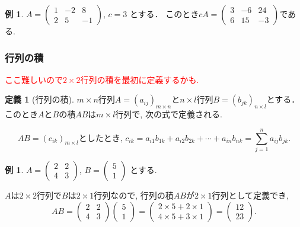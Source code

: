 \documentclass[dvipdfmx,a4paper,11pt]{article} %
\newcommand{\xr}[1]{\textcolor{red}{#1}}
\theoremstyle{definition}
\newtheorem{dfn}[thm]{定義}
\newtheorem{exa}[thm]{例}
\begin{document}
\begin{exa}
 $A = 
 \begin{pmatrix}
 1 &-2&8 \\
 2&5&-1
 \end{pmatrix}
 $,
 $
 c =3
 $
 とする．
 このとき$
 cA =
 \begin{pmatrix}
 3 &-6&24 \\
 6&15&-3
 \end{pmatrix}
 $である.
 \end{exa}
 
  \subsubsection{行列の積}
 
\xr{ここ難しいので$2 \times 2$行列の積を最初に定義するかも.}
    \begin{dfn}[行列の積]
    
 $m \times n$行列$A =(a_{ij})_{m \times n}$と$n \times l$行列$B= (b_{jk})_{n \times l}$とする．
このとき$A$と$B$の積$AB$は$m \times l$行列で, 次の式で定義される.

$$
AB = (c_{ik})_{m \times l}\text{としたとき, }
c_{ik} = a_{i1}b_{1k} + a_{i2}b_{2k} + \cdots + a_{in}b_{nk} = \sum_{j=1}^{n} a_{ij}b_{jk}.
$$
  \end{dfn}

 
  \begin{exa}
 $ A= 
 \begin{pmatrix}
2 & 2\\
4 & 3
 \end{pmatrix}
 $, $
 B = 
 \begin{pmatrix}
5 \\1
 \end{pmatrix}
 $
 とする. 
 
 $A$は$2\times 2$行列で$B$は$2 \times 1$行列なので, 行列の積$AB$が$2 \times 1$行列として定義でき, 
 $$
 AB = 
 \begin{pmatrix}
2 & 2\\
4 & 3
 \end{pmatrix}
  \begin{pmatrix}
5 \\1
 \end{pmatrix}
 =  
 \begin{pmatrix}
2\times 5 + 2\times 1 \\
4 \times 5 + 3 \times 1
 \end{pmatrix}
 = 
  \begin{pmatrix}
12 \\
23
 \end{pmatrix}.
 $$
 
 \end{exa}
 
\end{document}
